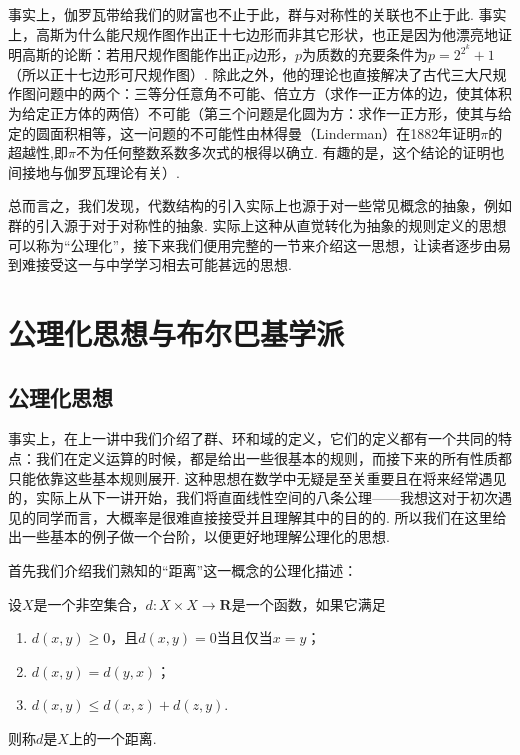 事实上，伽罗瓦带给我们的财富也不止于此，群与对称性的关联也不止于此. 事实上，高斯为什么能尺规作图作出正十七边形而非其它形状，也正是因为他漂亮地证明高斯的论断：若用尺规作图能作出正$p$边形，$p$为质数的充要条件为$p=2^{2^k}+1$（所以正十七边形可尺规作图）. 除此之外，他的理论也直接解决了古代三大尺规作图问题中的两个：三等分任意角不可能、倍立方（求作一正方体的边，使其体积为给定正方体的两倍）不可能（第三个问题是化圆为方：求作一正方形，使其与给定的圆面积相等，这一问题的不可能性由林得曼（Linderman）在1882年证明$\pi$的超越性,即$\pi$不为任何整数系数多次式的根得以确立. 有趣的是，这个结论的证明也间接地与伽罗瓦理论有关）.

总而言之，我们发现，代数结构的引入实际上也源于对一些常见概念的抽象，例如群的引入源于对于对称性的抽象. 实际上这种从直觉转化为抽象的规则定义的思想可以称为``公理化''，接下来我们便用完整的一节来介绍这一思想，让读者逐步由易到难接受这一与中学学习相去可能甚远的思想.

\section{公理化思想与布尔巴基学派}

\subsection{公理化思想}

事实上，在上一讲中我们介绍了群、环和域的定义，它们的定义都有一个共同的特点：我们在定义运算的时候，都是给出一些很基本的规则，而接下来的所有性质都只能依靠这些基本规则展开. 这种思想在数学中无疑是至关重要且在将来经常遇见的，实际上从下一讲开始，我们将直面线性空间的八条公理——我想这对于初次遇见的同学而言，大概率是很难直接接受并且理解其中的目的的. 所以我们在这里给出一些基本的例子做一个台阶，以便更好地理解公理化的思想.

首先我们介绍我们熟知的``距离''这一概念的公理化描述：
\begin{definition}{}{}
    设$X$是一个非空集合，$d\colon X\times X\to \mathbf{R}$是一个函数，如果它满足
    \begin{enumerate}
        \item $d(x,y)\geqslant 0$，且$d(x,y)=0$当且仅当$x=y$；

        \item $d(x,y)=d(y,x)$；

        \item $d(x,y)\leqslant d(x,z)+d(z,y)$.
    \end{enumerate}
    则称$d$是$X$上的一个距离.
\end{definition}


